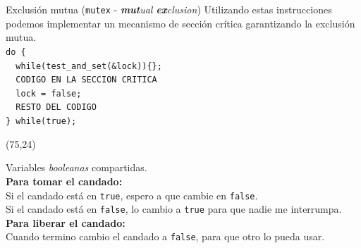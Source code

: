 \documentclass[aspectratio=169]{beamer}
\begin{document}
\begin{frame}[fragile,t]{Exclusión mutua (\texttt{mutex} - \emph{\textbf{mut}ual \textbf{ex}clusion})}
    Utilizando estas instrucciones podemos implementar un mecanismo de sección crítica garantizando la exclusión mutua.\\
    \small
    \bigskip
    \verb|do {                              |\\
    \vspace{0.2cm}
    \color{verdeuca}
    \verb|  while(test_and_set(&lock)){};   |\\
    \vspace{0.2cm}
    \color{red}
    \verb|  CODIGO EN LA SECCION CRITICA    |\\
    \color{black}
    \vspace{0.2cm}
    \color{verdeuca}
    \verb|  lock = false;                   |\\
    \color{black}
    \vspace{0.2cm}
    \verb|  RESTO DEL CODIGO                |\\
    \vspace{0.2cm}
    \verb|} while(true);                    |
    \begin{textblock}{65}(75,24)
    \begin{tcolorbox}[size=small,width=\textwidth,title={Candados (\emph{locks})}]
    Variables \emph{booleanas} compartidas.\vspace{0.2cm}\\
    \textbf{Para tomar el candado:}\vspace{0.2cm}\\
    Si el candado está en \texttt{true}, espero a que cambie en \texttt{false}.\\
    Si el candado está en \texttt{false}, lo cambio a \texttt{true} para que nadie me interrumpa.\vspace{0.2cm}\\
    \textbf{Para liberar el candado:}\vspace{0.2cm}\\
    Cuando termino cambio el candado a \texttt{false}, para que otro lo pueda usar.
    \end{tcolorbox}
    \end{textblock}
\end{frame}

% 
%     
%     
%         
%     
%     
%         
\end{document}
